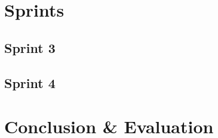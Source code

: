 \documentclass[12pt]{report}
\begin{document}
	

\part{Sprints}


	

	

	

	

	

	

	

	


	

	

	

	

	

	

	

	

\chapter{Sprint 3}

\chapter{Sprint 4}

\part{Conclusion \& Evaluation}
\end{document}
